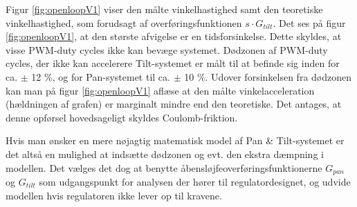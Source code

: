 Figur \ref{fig:openloopV1} viser den målte vinkelhastighed samt den teoretiske vinkelhastighed,
som forudsagt af overføringsfunktionen \(s\cdot{}G_{tilt}\).
Det ses på figur \ref{fig:openloopV1}, at den største afvigelse er en tidsforsinkelse.
Dette skyldes, at visse PWM-duty cycles ikke kan bevæge systemet.
Dødzonen af PWM-duty cycles, der ikke kan accelerere Tilt-systemet er målt til at befinde sig inden for
ca. \(\pm\) 12 \%, og for Pan-systemet til ca. \(\pm\) 10 \%.
Udover forsinkelsen fra dødzonen kan man på figur \ref{fig:openloopV1} aflæse
at den målte vinkelacceleration (hældningen af grafen) er marginalt mindre end den teoretiske.
Det antages, at denne opførsel hovedsageligt skyldes Coulomb-friktion.

Hvis man ønsker en mere nøjagtig matematisk model af Pan \& Tilt-systemet
er det altså en mulighed at indsætte dødzonen og evt. den ekstra dæmpning i modellen.
Det vælges det dog at benytte åbensløjfeoverføringsfunktionerne \(G_{pan}\) og \(G_{tilt}\)
som udgangspunkt for analysen der hører til regulatordesignet,
og udvide modellen hvis regulatoren ikke lever op til kravene.